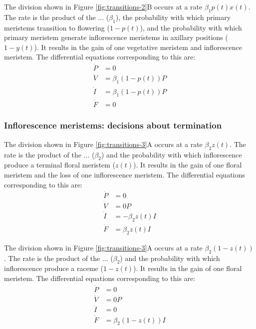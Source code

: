 \documentclass[12pt, oneside]{article}   	%
\begin{document}
The division shown in Figure \ref{fig:transitions-2}B occurs at a rate $\beta_1 p(t) x(t)$. The rate is the product of the ... ($\beta_1$), the probability with which primary meristems transition to flowering ($1-p(t)$), and the probability with which primary meristem generate inflorescence meristems in axillary positions ($1 - y(t)$). It results in the gain of one vegetative meristem and inflorescence meristem. The differential equations corresponding to this are:
%
\begin{align}
\dot{P} & = 0 \nonumber \\
\dot{V} & = \beta_1 ( 1 - p(t) ) P      \nonumber \\
\dot{I} & =  \beta_1 ( 1 - p(t) ) P  \nonumber \\
\dot{F} & = 0
\end{align}
%

\subsubsection*{Inflorescence meristems: decisions about termination}

The division shown in Figure \ref{fig:transitions-3}A occurs at a rate $\beta_2 z(t)$. The rate is the product of the ... ($\beta_2$) and the probability with which inflorescence produce a terminal floral meristem ($z(t)$). It results in the gain of one floral meristem and the loss of one inflorescence meristem. The differential equations corresponding to this are:
%
\begin{align}
\dot{P} & = 0 \nonumber \\
\dot{V} & = 0P      \nonumber \\
\dot{I} & = - \beta_2 z(t) I  \nonumber \\
\dot{F} & = \beta_2 z(t) I 
\end{align}
%

The division shown in Figure \ref{fig:transitions-3}A occurs at a rate $\beta_2 ( 1-z(t) )$. The rate is the product of the ... ($\beta_2$) and the probability with which inflorescence produce a raceme ($1 - z(t)$). It results in the gain of one floral meristem. The differential equations corresponding to this are:
%
\begin{align}
\dot{P} & = 0 \nonumber \\
\dot{V} & = 0P      \nonumber \\
\dot{I} & = 0  \nonumber \\
\dot{F} & = \beta_2 ( 1 - z(t) ) I 
\end{align}
%
\end{document}
